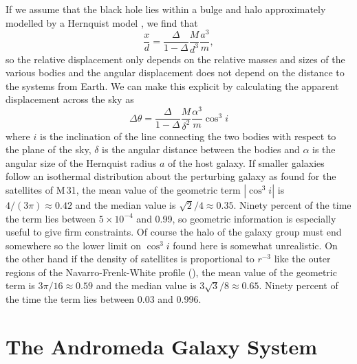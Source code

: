 \documentclass[useAMS,usenatbib]{mn2e}
\begin{document}
If we assume that the black hole lies within a bulge and
halo approximately modelled by a Hernquist model \citep[as
  in][]{1997ApJ...487..153V}, we find that
\begin{equation}
  \frac{x}{d} = 
\frac{\Delta}{1-\Delta} \frac{M}{d^3} \frac{a^3}{m},
  \label{eq:13}
\end{equation}
so the relative displacement only depends on the relative masses and
sizes of the various bodies and the angular displacement does not
depend on the distance to the systems from Earth.  We can make this
explicit by calculating the apparent displacement across the sky as
\begin{equation}
  \Delta \theta = \frac{\Delta}{1-\Delta} \frac{M}{\delta^2} \frac{\alpha^3}{m} \cos^3 i
\end{equation}
where $i$ is the inclination of the line connecting the two bodies
with respect to the plane of the sky, $\delta$ is the angular distance
between the bodies and $\alpha$ is the angular size of the Hernquist
radius $a$ of the host galaxy.  If smaller galaxies follow
an isothermal distribution about the perturbing galaxy as
\citet{2006AJ....131.1405K} found for the satellites of M\,31, the
mean value of the geometric term $|\cos^3i|$ is $4/(3\pi) \approx
0.42$ and the median value is $\sqrt{2}/4\approx 0.35$.  Ninety
percent of the time the term lies between $5\times 10^{-4}$ and 0.99,
so geometric information is especially useful to give firm
constraints.  Of course the halo of the galaxy group must end
somewhere so the lower limit on $\cos^3 i$ found here is somewhat
unrealistic.  On the other hand if the density of satellites is
proportional to $r^{-3}$ like the outer regions of the
Navarro-Frenk-White profile (\citeyear{1996ApJ...462..563N}), the mean
value of the geometric term is $3\pi/16 \approx 0.59$ and the median
value is $3\sqrt{3}/8 \approx 0.65$.  Ninety percent of the time the
term lies between 0.03 and 0.996.

\section{The Andromeda Galaxy System}
\end{document}
